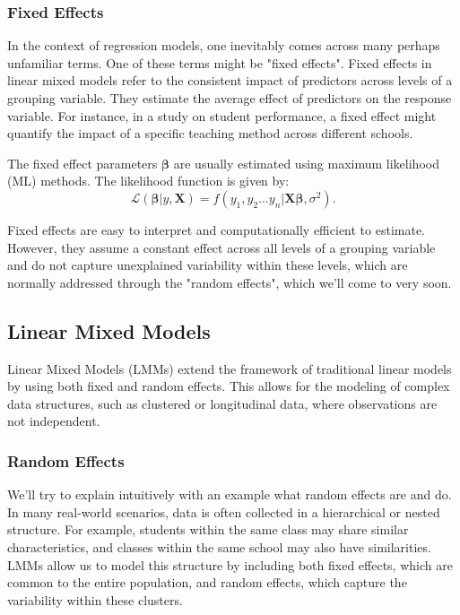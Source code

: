 \documentclass[12pt, twoside,hidelinks]{article}
\theoremstyle{definition}
\numberwithin{equation}{section}
\begin{document}
\subsubsection{Fixed Effects}\label{sec:regmod:linmod:fix}
In the context of regression models, one inevitably comes across many perhaps unfamiliar terms. One of these terms might be "fixed effects". Fixed effects in linear mixed models refer to the consistent impact of predictors across levels of a grouping variable. They estimate the average effect of predictors on the response variable. For instance, in a study on student performance, a fixed effect might quantify the impact of a specific teaching method across different schools.

The fixed effect parameters $\boldsymbol{\beta}$ are usually estimated using maximum likelihood (ML) methods. The likelihood function is given by:
\begin{equation}
\mathcal{L}(\boldsymbol{\beta} | y, \mathbf{X}) = f(y_1, y_2  \ldots y_n | \mathbf{X}\boldsymbol{\beta}, \sigma^2).
\label{eq:likelihood_function}
\end{equation}

Fixed effects are easy to interpret and computationally efficient to estimate. However, they assume a constant effect across all levels of a grouping variable and do not capture unexplained variability within these levels, which are normally addressed through the "random effects", which we'll come to very soon.

\subsection{Linear Mixed Models}\label{sec:regmod:linmixmod}
Linear Mixed Models (LMMs) extend the framework of traditional linear models by using both fixed and random effects. This allows for the modeling of complex data structures, such as clustered or longitudinal data, where observations are not independent.
\newline 

\subsubsection{Random Effects}\label{sec:regmod:linmixmod:re}

We'll try to explain intuitively with an example what random effects are and do. In many real-world scenarios, data is often collected in a hierarchical or nested structure. For example, students within the same class may share similar characteristics, and classes within the same school may also have similarities. LMMs allow us to model this structure by including both fixed effects, which are common to the entire population, and random effects, which capture the variability within these clusters.
\newline
\end{document}
